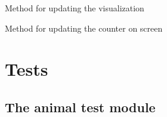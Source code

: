 \documentclass[a4paper,10pt,english]{sphinxmanual}
\begin{document}
\begin{fulllineitems}
\begin{fulllineitems}
\label{\detokenize{simulation:biosim.simulation.BioSim.update_visualization}}
Method for updating the visualization

\end{fulllineitems}


\begin{fulllineitems}
\label{\detokenize{simulation:biosim.simulation.BioSim.year_counter}}
Method for updating the counter on screen

\end{fulllineitems}


\end{fulllineitems}



\chapter{Tests}
\label{\detokenize{tests:tests}}\label{\detokenize{tests::doc}}

\section{The animal test module}
\label{\detokenize{tests:the-animal-test-module}}\label{\detokenize{tests:module-biosim.tests.test_animals}}
\end{document}
